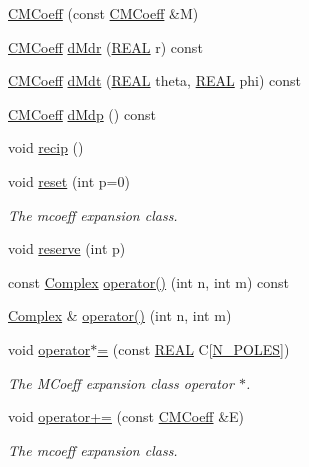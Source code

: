 \begin{DoxyCompactItemize}
\hyperlink{classCMCoeff_ae5a7fcbb8f989dbbff71d79738fd9356}{C\-M\-Coeff} (const \hyperlink{classCMCoeff}{C\-M\-Coeff} \&M)
\item 
\hyperlink{classCMCoeff}{C\-M\-Coeff} \hyperlink{classCMCoeff_aab926cdd2ef1a0f188f82603108296a8}{d\-Mdr} (\hyperlink{util_8h_a5821460e95a0800cf9f24c38915cbbde}{R\-E\-A\-L} r) const 
\item 
\hyperlink{classCMCoeff}{C\-M\-Coeff} \hyperlink{classCMCoeff_a2e9e6517ed48d1758af058f95b5af50c}{d\-Mdt} (\hyperlink{util_8h_a5821460e95a0800cf9f24c38915cbbde}{R\-E\-A\-L} theta, \hyperlink{util_8h_a5821460e95a0800cf9f24c38915cbbde}{R\-E\-A\-L} phi) const 
\item 
\hyperlink{classCMCoeff}{C\-M\-Coeff} \hyperlink{classCMCoeff_a3457ae837d9f8d250757fae3fd69c441}{d\-Mdp} () const 
\item 
void \hyperlink{classCMCoeff_a6e7e750022bf6a6f32dff9092881647c}{recip} ()
\item 
void \hyperlink{classCMCoeff_a5fc4a2ee0ab437bd601fd67ccc5bd43b}{reset} (int p=0)
\begin{DoxyCompactList}\small\item\em The mcoeff expansion class. \end{DoxyCompactList}\item 
void \hyperlink{classCMCoeff_a10d5db85d700255768d091c10fda818c}{reserve} (int p)
\item 
const \hyperlink{util_8h_a0ef19d29521fc1e3356ea268ba175cfc}{Complex} \hyperlink{classCMCoeff_a8776dd638fca3d95f813acb93c7896c7}{operator()} (int n, int m) const 
\item 
\hyperlink{util_8h_a0ef19d29521fc1e3356ea268ba175cfc}{Complex} \& \hyperlink{classCMCoeff_ad6668675df0fa31437bebee2a2b00e0f}{operator()} (int n, int m)
\item 
void \hyperlink{classCMCoeff_a63d33423be766832461e5e20a0f21f66}{operator$\ast$=} (const \hyperlink{util_8h_a5821460e95a0800cf9f24c38915cbbde}{R\-E\-A\-L} C\mbox{[}\hyperlink{mcoeff_8h_ac23f9c13c5d07d9ce386f7a830c35e5a}{N\-\_\-\-P\-O\-L\-E\-S}\mbox{]})
\begin{DoxyCompactList}\small\item\em The M\-Coeff expansion class operator $\ast$. \end{DoxyCompactList}\item 
void \hyperlink{classCMCoeff_ac889bdd0230f6c3f11b8af06915410fe}{operator+=} (const \hyperlink{classCMCoeff}{C\-M\-Coeff} \&E)
\begin{DoxyCompactList}\small\item\em The mcoeff expansion class. \end{DoxyCompactList}\item 

\end{DoxyCompactItemize}
